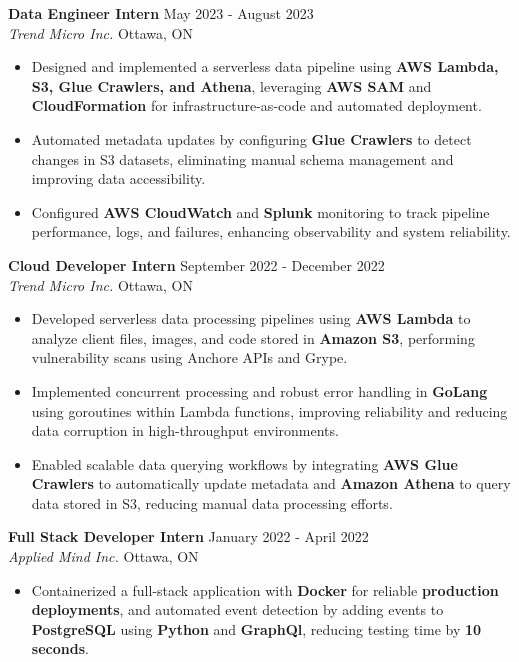 \documentclass[a4paper]{article}
\begin{document}
\textbf{Data Engineer Intern} \hfill May 2023 - August 2023\\
\textit{Trend Micro Inc.} \hfill Ottawa, ON\\
\vspace{-2mm}
\begin{itemize} \itemsep -2pt
\item Designed and implemented a serverless data pipeline using \textbf{AWS Lambda, S3, Glue Crawlers, and Athena}, leveraging \textbf{AWS SAM} and \textbf{CloudFormation} for infrastructure-as-code and automated deployment.
\item Automated metadata updates by configuring \textbf{Glue Crawlers} to detect changes in S3 datasets, eliminating manual schema management and improving data accessibility.
\item Configured \textbf{AWS CloudWatch} and \textbf{Splunk} monitoring to track pipeline performance, logs, and failures, enhancing observability and system reliability.
\end{itemize}
\textbf{Cloud Developer Intern} \hfill September 2022 - December 2022\\
\textit{Trend Micro Inc.} \hfill Ottawa, ON\\
\vspace{-2mm}
\begin{itemize} \itemsep -2pt
\item Developed serverless data processing pipelines using \textbf{AWS Lambda} to analyze client files, images, and code stored in \textbf{Amazon S3}, performing vulnerability scans using Anchore APIs and Grype.
\item Implemented concurrent processing and robust error handling in \textbf{GoLang} using goroutines within Lambda functions, improving reliability and reducing data corruption in high-throughput environments.
\item Enabled scalable data querying workflows by integrating \textbf{AWS Glue Crawlers} to automatically update metadata and \textbf{Amazon Athena} to query data stored in S3, reducing manual data processing efforts.
\end{itemize}
\textbf{Full Stack Developer Intern} \hfill January 2022 - April 2022\\
\textit{Applied Mind Inc.} \hfill Ottawa, ON\\
\vspace{-2mm}
\begin{itemize} \itemsep -2pt
\item Containerized a full-stack application with \textbf{Docker} for reliable \textbf{production deployments}, and automated event detection by adding events to \textbf{PostgreSQL} using \textbf{Python} and \textbf{GraphQl}, reducing testing time by \textbf{10 seconds}.
\end{itemize}
\vspace{5mm}
\end{document}
